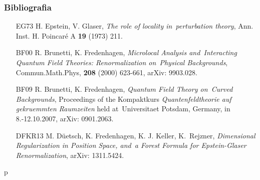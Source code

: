 \documentclass[10pt,t]{beamer}
\begin{document}
\begin{frame}
  \frametitle{Bibliografia}


  \begin{itemize}
    \RaggedRight

  \item [EG73] H. Epstein, V. Glaser, \textit{The role of locality
    in~perturbation theory}, Ann. Inst. H. Poincar\'{e} A
    \textbf{19} (1973) 211.

  \item [BF00] R. Brunetti, K. Fredenhagen, \textit{Microlocal Analysis
    and~Interacting Quantum Field Theories: Renormalization
    on~Physical Backgrounds}, Commun.Math.Phys, \textbf{208} (2000)
    623-661, arXiv: 9903.028.

  \item [BF09] R. Brunetti, K. Fredenhagen, \textit{Quantum Field
    Theory on~Curved Backgrounds}, Proceedings of the
    Kompaktkurs \textit{Quantenfeldtheorie auf gekruemmten Raumzeiten} held
    at~Universitaet Potsdam, Germany, in 8.-12.10.2007, arXiv:
    0901.2063.

  \item [DFKR13] M. D\"{u}etsch, K. Fredenhagen, K. J. Keller,
    K.~Rejzner, \textit{Dimensional Regularization in Position Space,
      and~a Forest Formula for Epstein-Glaser Renormalization}, arXiv:
    1311.5424.

  \end{itemize}

\end{frame}











p
{}






\end{document}
